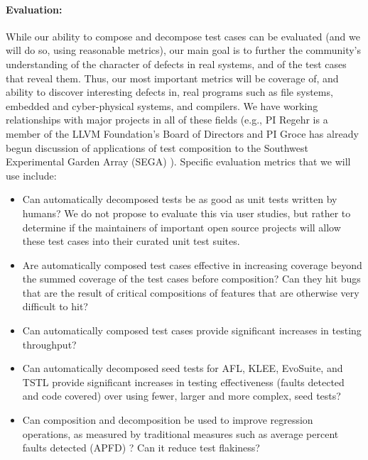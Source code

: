 \paragraph{Evaluation:}
%
While our ability to compose and decompose test cases can be evaluated
(and we will do so, using reasonable metrics), our main goal is to
further the community's understanding of the character of defects in
real systems, and of the test cases that reveal them.
%
Thus, our most important metrics will be coverage of, and ability to
discover interesting defects in, real programs such as file systems,
embedded and cyber-physical systems, and compilers.  We have working
relationships with major projects in all of these fields (e.g., PI
Regehr is a member of the LLVM Foundation's Board of Directors and PI
Groce has already begun discussion of applications of test composition
to the Southwest Experimental Garden Array  (SEGA) \cite{SEGA,FlikkemaSEGA}).
%
Specific evaluation metrics that we will use include:
\begin{itemize}
\item Can automatically decomposed tests be as good as unit tests
  written by humans? We do not propose to evaluate this via user studies, but rather
  to determine if the maintainers of important open source projects will allow
  these test cases into their curated unit test suites.
\item Are automatically composed test cases effective in increasing
  coverage beyond the summed coverage of the test cases before
  composition?  Can they hit bugs that are the result of critical
  compositions of features that are otherwise very difficult to hit?
\item Can automatically composed test cases provide significant
increases in testing throughput?
\item Can automatically decomposed seed tests for AFL, KLEE,
  EvoSuite, and TSTL provide significant
  increases in testing effectiveness (faults detected and code
  covered) over using fewer, larger and more complex,
  seed tests?
\item Can composition and decomposition be used to improve regression
  operations, as measured by traditional measures such as average
  percent faults detected (APFD)
  \cite{APFD}?  Can it reduce test flakiness?
\end{itemize}


